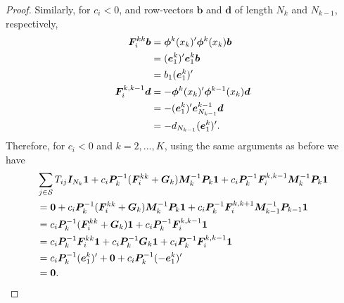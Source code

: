 \begin{proof}
	Similarly, for \(c_i<0\), and row-vectors \(\boldsymbol b\) and \(\boldsymbol d\) of length \(N_k\) and \(N_{k-1}\), respectively, 
	\begin{align*}
		\boldsymbol F_i^{kk}\boldsymbol b &= \boldsymbol \phi^k(x_{k})'{} \boldsymbol \phi^k(x_{k})\boldsymbol b \\&= (\boldsymbol e^{k}_{1})'{} \boldsymbol e_{1}^{k}\boldsymbol b  \\&= b_{1}(\boldsymbol e_{1}^k)'{} 
		\\\boldsymbol F_i^{k,k-1}\boldsymbol d &= -\boldsymbol \phi^{k}(x_{k})'{} \boldsymbol \phi^{k-1}(x_{k})\boldsymbol d \\&= -(\boldsymbol e^{k}_{1})'{} \boldsymbol e_{N_{k-1}}^{k-1}\boldsymbol d \\&= -d_{N_{k-1}}(\boldsymbol e_{1}^k)'{}.
		\end{align*} 
		Therefore, for \(c_i<0\) and \(k=2,...,K\), using the same arguments as before we have
	\begin{align*}
		&\sum_{j\in\mathcal{S}}T_{ij}\boldsymbol I_{N_k}\boldsymbol 1 + c_i \boldsymbol P_k^{-1}(\boldsymbol F_i^{kk}+\boldsymbol G_k)\boldsymbol M_k^{-1}\boldsymbol P_k\boldsymbol 1 + c_i \boldsymbol P_k^{-1}\boldsymbol F_i^{k,k-1}\boldsymbol M_k^{-1}\boldsymbol P_k\boldsymbol 1
		\\&= \boldsymbol 0 + c_i \boldsymbol P_k^{-1}(\boldsymbol F_i^{kk}+\boldsymbol G_k)\boldsymbol M_k^{-1}\boldsymbol P_k\boldsymbol 1 + c_i \boldsymbol P_k^{-1}\boldsymbol F_i^{k,k+1}\boldsymbol M_{k-1}^{-1}\boldsymbol P_{k-1}\boldsymbol 1
		\\&= c_i \boldsymbol P_k^{-1}(\boldsymbol F_i^{kk}+\boldsymbol G_k)\boldsymbol 1 + c_i \boldsymbol P_k^{-1}\boldsymbol F_i^{k,k-1}\boldsymbol 1
		\\&= c_i \boldsymbol P_k^{-1}\boldsymbol F_i^{kk}\boldsymbol 1 + c_i \boldsymbol P_k^{-1}\boldsymbol G_k\boldsymbol 1 + c_i \boldsymbol P_k^{-1}\boldsymbol F_i^{k,k-1}\boldsymbol 1
		\\&= c_i \boldsymbol P_k^{-1}(\boldsymbol e_{1}^k)'{} + \boldsymbol 0 + c_i \boldsymbol P_k^{-1}(-\boldsymbol e_{1}^k)'{}
		\\&= \boldsymbol 0.
	\end{align*}
	

\end{proof}
